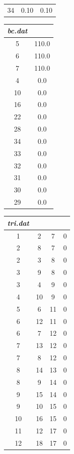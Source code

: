 \documentclass[11pt]{amsart}
\begin{document}
\begin{table}[t]
\begin{tabular}[t]{c c c}
        34  &    0.10  &  0.10
    \end{tabular}
    \hfill
    \begin{tabular}[t]{c c}
        	\textit{bc.dat} & \\ \hline
	5    &   110.0\\
        6     &   110.0\\
        7     &   110.0\\
        4     &   0.0\\
        10   &    0.0\\
        16   &    0.0\\
        22   &    0.0\\
        28   &    0.0\\
        34   &    0.0\\
        33   &    0.0\\
        32   &    0.0\\
        31   &   0.0\\
        30   &   0.0\\
        29   &   0.0
    \end{tabular}
    \hfill
    \begin{tabular}[t]{c c c c}
    	\textit{tri.dat} & & & \\ \hline
        1    &   2   &    7 &0\\
        2    &   8   &    7 &0\\
        2    &   3   &    8 &0\\
        3    &   9   &    8 &0\\
        3    &   4   &    9 &0\\
        4    &   10 &    9 &0\\
        5    &   6   &    11 &0\\
        6    &   12 &    11 &0\\
        6    &   7   &    12 &0\\
        7    &   13 &    12 &0\\
        7    &   8   &    12 &0\\
        8    &   14 &    13 &0\\
        8    &   9   &    14 &0\\
        9    &   15 &     14 &0\\
        9    &   10 &     15 &0\\
        10  &    16&     15 &0\\
        11  &    12&     17 &0\\
        12  &    18&     17 &0\\

\end{tabular}
\end{table}
\end{document}
